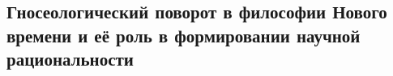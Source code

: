 \subsection{Гносеологический поворот в философии Нового времени и её роль в формировании
научной рациональности}






